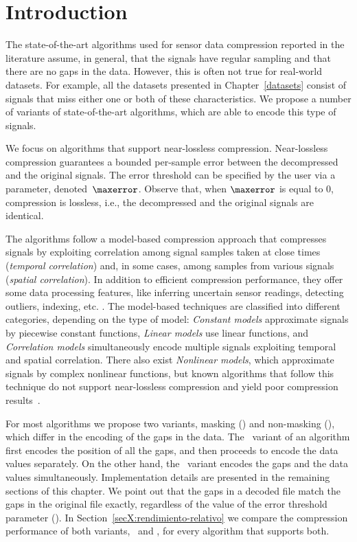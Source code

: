 

\section{Introduction}
\label{algo:overview}


The state-of-the-art algorithms used for sensor data compression reported in the literature \cite{AnEva2013, Signal2016} assume, in general, that the signals have regular sampling and that there are no gaps in the data. However, this is often not true for real-world datasets. For example, all the datasets presented in Chapter~\ref{datasets} consist of signals that miss either one or both of these characteristics. We propose a number of variants of state-of-the-art algorithms, which are able to encode this type of signals. 


We focus on algorithms that support near-lossless compression. Near-lossless compression guarantees a bounded per-sample error between the decompressed and the original signals. The error threshold can be specified by the user via a parameter, denoted~$\maxerror$. Observe that, when $\maxerror$ is equal to 0, compression is lossless, i.e., the decompressed and the original signals are identical.


The algorithms follow a model-based compression approach that compresses signals by exploiting correlation among signal samples taken at close times (\textit{temporal correlation}) and, in some cases, among samples from various signals (\textit{spatial correlation}). In addition to efficient compression performance, they offer some data processing features, like inferring uncertain sensor readings, detecting outliers, indexing, etc. \cite{AnEva2013}. The model-based techniques are classified into different categories, depending on the type of model: \textit{Constant models} approximate signals by piecewise constant functions, \textit{Linear models} use linear functions, and \textit{Correlation models} simultaneously encode multiple signals exploiting temporal and spatial correlation. There also exist \textit{Nonlinear models}, which approximate signals by complex nonlinear functions, but known algorithms that follow this technique do not support near-lossless compression and yield poor compression results~\cite{AnEva2013}. 


For most algorithms we propose two variants, masking (\maskalgo) and non-masking (\NOmaskalgo), which differ in the encoding of the gaps in the data. The \maskalgo\ variant of an algorithm first encodes the position of all the gaps, and then proceeds to encode the data values separately. On the other hand, the \NOmaskalgo\ variant encodes the gaps and the data values simultaneously. Implementation details are presented in the remaining sections of this chapter. We point out that the gaps in a decoded file match the gaps in the original file exactly, regardless of the value of the error threshold parameter (\maxerror). In Section~\ref{secX:rendimiento-relativo} we compare the compression performance of both variants, \maskalgo\ and \NOmaskalgo, for every algorithm that supports both.



